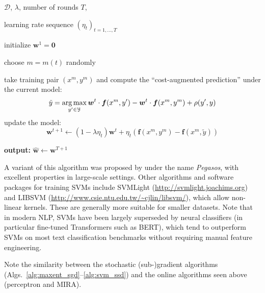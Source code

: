 \begin{algorithm}[t]

   \caption{Stochastic Subgradient Descent for SVMs \label{alg:svm_ssd}}

\begin{algorithmic}[1]

    $\mathcal{D}$, $\lambda$, number of rounds $T$,

   learning rate sequence $(\eta_t)_{t = 1,\ldots,T}$

   \STATE initialize $\boldsymbol{w}^1 = \mathbf{0}$

	\STATE choose $m = m(t)$ randomly

	\STATE take training pair $(x^m, y^m)$ and compute the ``cost-augmented prediction'' under the current model:
	$$\tilde{y} = \operatorname*{arg\,max}_{y' \in \mathcal{Y}} \boldsymbol{w}^t \cdot \boldsymbol{f}(x^m,y') - \boldsymbol{w}^t \cdot \boldsymbol{f}(x^m,y^m) + \rho(y',y)$$ 
	\STATE update the model: 
	$$\boldsymbol{w}^{t+1} \leftarrow (1-\lambda \eta_t) \boldsymbol{w}^{t} + \eta_t \left( \boldsymbol{f}(x^{m},y^{m}) 
	- \boldsymbol{f}(x^{m},\tilde{y})\right)$$
	\ENDFOR

   \STATE \textbf{output:} $\hat{\boldsymbol{w}} \leftarrow \boldsymbol{w}^{T+1}$

\end{algorithmic}

\end{algorithm}


A variant of this algorithm was proposed by \citet{ShalevShwartz2007ICML} under the name \emph{Pegasos}, with excellent properties in large-scale settings.
Other algorithms and software packages for training SVMs include SVMLight (\url{http://svmlight.joachims.org})
and LIBSVM (\url{http://www.csie.ntu.edu.tw/~cjlin/libsvm/}), which allow non-linear kernels. These are generally more suitable for smaller datasets.
Note that in modern NLP, SVMs have been largely superseded by neural classifiers (in particular fine-tuned Transformers such as BERT), which tend to outperform SVMs on most text classification benchmarks without requiring manual feature engineering.


\begin{remark}
Note the similarity 
between the stochastic (sub-)gradient algorithms (Algs.~\ref{alg:maxent_sgd}--\ref{alg:svm_ssd}) 
and the online algorithms seen above (perceptron and MIRA). 
\end{remark}

